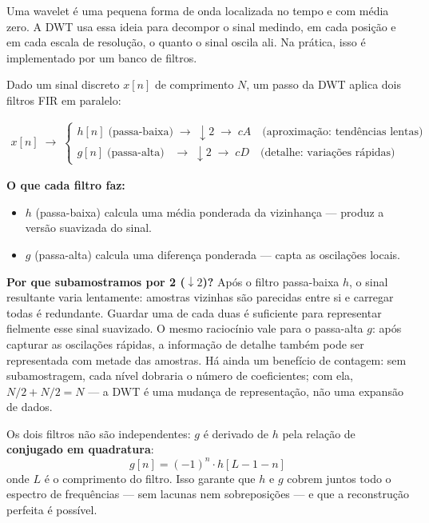 \documentclass[12pt, a4paper]{article}
\begin{document}
Uma wavelet é uma pequena forma de onda localizada no tempo e com média zero. A DWT usa essa ideia para decompor o sinal medindo, em cada posição e em cada escala de resolução, o quanto o sinal oscila ali. Na prática, isso é implementado por um banco de filtros.

Dado um sinal discreto $x[n]$ de comprimento $N$, um passo da DWT aplica dois filtros FIR em paralelo:

\begin{align*}
x[n] \;\longrightarrow\;
\begin{cases}
h[n] \;\text{(passa-baixa)} \;\longrightarrow\; {\downarrow}2 \;\longrightarrow\; cA \quad \text{(aproximação: tendências lentas)}\\
g[n] \;\text{(passa-alta)}\;\; \;\longrightarrow\; {\downarrow}2 \;\longrightarrow\; cD \quad \text{(detalhe: variações rápidas)}
\end{cases}
\end{align*}

\textbf{O que cada filtro faz:}
\begin{itemize}
    \item $h$ (passa-baixa) calcula uma média ponderada da vizinhança — produz a versão suavizada do sinal.
    \item $g$ (passa-alta) calcula uma diferença ponderada — capta as oscilações locais.
\end{itemize}

\textbf{Por que subamostramos por 2 (${\downarrow}2$)?} Após o filtro passa-baixa $h$, o sinal resultante varia lentamente: amostras vizinhas são parecidas entre si e carregar todas é redundante. Guardar uma de cada duas é suficiente para representar fielmente esse sinal suavizado. O mesmo raciocínio vale para o passa-alta $g$: após capturar as oscilações rápidas, a informação de detalhe também pode ser representada com metade das amostras. Há ainda um benefício de contagem: sem subamostragem, cada nível dobraria o número de coeficientes; com ela, $N/2 + N/2 = N$ — a DWT é uma mudança de representação, não uma expansão de dados.

Os dois filtros não são independentes: $g$ é derivado de $h$ pela relação de \textbf{conjugado em quadratura}:
\begin{equation}
    g[n] = (-1)^n \cdot h[L - 1 - n]
\end{equation}
onde $L$ é o comprimento do filtro. Isso garante que $h$ e $g$ cobrem juntos todo o espectro de frequências — sem lacunas nem sobreposições — e que a reconstrução perfeita é possível.
\end{document}
